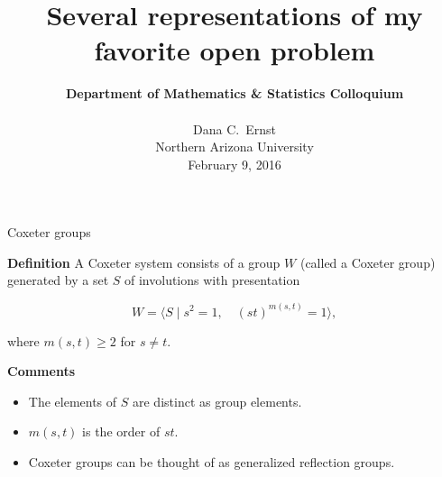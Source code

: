 \documentclass[10pt, compress,aspectratio=169,handout]{beamer}
\title{Several representations of my favorite open problem}
\subtitle{}
\author{{\large\textbf{Department of Mathematics \& Statistics Colloquium}}\\
\\
Dana C.~Ernst\\
Northern Arizona University\\
February 9, 2016}
\date{}
\begin{document}

\maketitle


\begin{frame}{Coxeter groups}\pause

\vspace{1em}

\begin{block}{\textbf{Definition}}
A \alert{Coxeter system} consists of a group $W$ (called a \alert{Coxeter group}) generated by a set $S$ of involutions with presentation

\vspace{-1em}

\[
W=\langle S\mid s^2=1,\quad (st)^{m(s,t)}=1\rangle,
\]

\vspace{-.25em}

where $m(s,t)\geq 2$ for $s\neq t$. 
\end{block}

\pause

\begin{block}{\textbf{Comments}}

\vspace{-.5em}

\begin{itemize}

\item The elements of $S$ are distinct as group elements.
\item $m(s, t)$ is the order of $st$.
\item Coxeter groups can be thought of as generalized reflection groups.
\end{itemize}
\end{block}

\end{frame}

\end{document}
